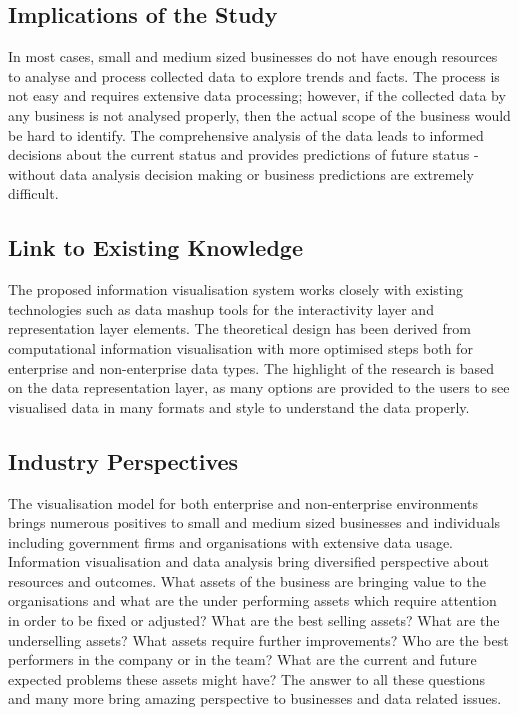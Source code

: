\subsection{Implications of the Study}

In most cases, small and medium sized businesses do not have enough resources to analyse and process collected data to explore trends and facts. The process is not easy and requires extensive data processing; however, if the collected data by any business is not analysed properly, then the actual scope of the business would be hard to identify. The comprehensive analysis of the data leads to informed decisions about the current status and provides predictions of future status - without data analysis decision making or business predictions are extremely difficult.

\subsection{Link to Existing Knowledge}

The proposed information visualisation system works closely with existing technologies such as data mashup tools for the interactivity layer and representation layer elements. The theoretical design has been derived from computational information visualisation \cite{fry} with more optimised steps both for enterprise and non-enterprise data types. The highlight of the research is based on the data representation layer, as many options are provided to the users to see visualised data in many formats and style to understand the data properly. 

\subsection{Industry Perspectives}

The visualisation model for both enterprise and non-enterprise environments brings numerous positives to small and medium sized businesses and individuals including government firms and organisations with extensive data usage. Information visualisation and data analysis bring diversified perspective about resources and outcomes. What assets of the business are bringing value to the organisations and what are the under performing assets which require attention in order to be fixed or adjusted? What are the best selling assets? What are the underselling assets? What assets require further improvements? Who are the best performers in the company or in the team? What are the current and future expected problems these assets might have? The answer to all these questions and many more bring amazing perspective to businesses and data related issues. 

